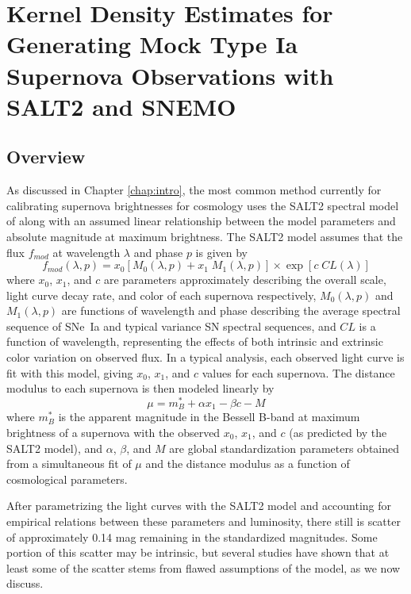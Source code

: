 \chapter{Kernel Density Estimates for Generating Mock Type Ia Supernova Observations with SALT2 and SNEMO}
\label{chap:kde}

\section{Overview}
As discussed in Chapter \ref{chap:intro}, the most common method currently for calibrating supernova brightnesses for cosmology uses the SALT2 spectral model of \cite{guy_salt2_2007} along with an assumed linear relationship between the model parameters and absolute magnitude at maximum brightness. The SALT2 model assumes that the flux $f_{mod}$ at wavelength $\lambda$ and phase $p$ is given by
\begin{equation}
    f_{mod}(\lambda, p) = x_0 \left[M_0(\lambda, p) + x_1\;M_1(\lambda, p)\right] \times \exp\left[c\;CL(\lambda)\right]
    \label{eqn:salt_flux_model}
\end{equation}
where $x_0$, $x_1$, and $c$ are parameters approximately describing the overall scale, light curve decay rate, and color of each supernova respectively, $M_0(\lambda, p)$ and $M_1(\lambda, p)$ are functions of wavelength and phase describing the average spectral sequence of SNe~Ia and typical variance SN spectral sequences, and $CL$ is a function of wavelength, representing the effects of both intrinsic and extrinsic color variation on observed flux. In a typical analysis, each observed light curve is fit with this model, giving $x_0$, $x_1$, and $c$ values for each supernova. The distance modulus to each supernova is then modeled linearly \citep{tripp_two-parameter_1998, tripp_determination_1999} by
\begin{equation}
    \mu = m_B^* + \alpha x_1 -\beta c - M
\end{equation}
where $m_B^*$ is the apparent magnitude in the Bessell B-band at maximum brightness of a supernova with the observed $x_0$, $x_1$, and $c$ (as predicted by the SALT2 model), and $\alpha$, $\beta$, and $M$ are global standardization parameters obtained from a simultaneous fit of $\mu$ and the distance modulus as a function of cosmological parameters.

After parametrizing the light curves with the SALT2 model and accounting for empirical relations between these parameters and luminosity, there still is scatter of approximately 0.14 mag remaining in the standardized magnitudes. Some portion of this scatter may be intrinsic, but several studies have shown that at least some of the scatter stems from flawed assumptions of the model, as we now discuss.

